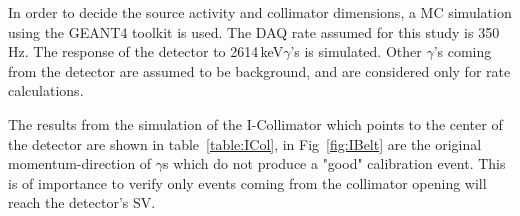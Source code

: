 In order to decide the source activity and collimator dimensions, a MC simulation using the GEANT4 toolkit is used. The DAQ rate assumed for this study is 350\,Hz. The response of the detector to 2614\,keV$\gamma$'s is simulated. Other $\gamma$'s coming from the detector are assumed to be background, and are considered only for rate calculations.

The results from the simulation of the I-Collimator which points to the center of the detector are shown in table~\ref{table:ICol}, in Fig~\ref{fig:IBelt} are the original momentum-direction of $\gamma$s which do not produce a "good" calibration event. This is of importance to verify only events coming from the collimator opening will reach the detector's SV.


\begin{table}
\begin{center}

\caption{result of GEANT4 simulations for a 16X16X16cm collimator with an aperture of $45 \deg$, a good event is an event that scattered only once in the FV with energy deposition of 2-15 keVee}
\label{table:ICol}
\end{center}
\end{table}


